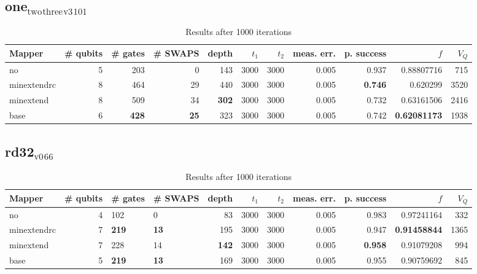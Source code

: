 \documentclass[11pt]{article}
\begin{document}
\subsection{one\(_{\text{two}}\)\(_{\text{three}}\)\(_{\text{v3}}\)\(_{\text{101}}\)}
\label{sec:orgfd1d4fc}
\begin{table}[H]
\caption{\label{tab:org465b645}
Results after 1000 iterations}
\centering
\small
\begin{tabular}{lrrrrrrrrrr}
\hline
Mapper & \# qubits & \# gates & \# SWAPS & depth & \(t_1\) & \(t_2\) & meas. err. & p. success & \(f\) & \(V_Q\)\\
\hline
no & 5 & 203 & 0 & 143 & 3000 & 3000 & 0.005 & 0.937 & 0.88807716 & 715\\
\hline
minextendrc & 8 & 464 & 29 & 440 & 3000 & 3000 & 0.005 & \textbf{0.746} & 0.620299 & 3520\\
minextend & 8 & 509 & 34 & \textbf{302} & 3000 & 3000 & 0.005 & 0.732 & 0.63161506 & 2416\\
base & 6 & \textbf{428} & \textbf{25} & 323 & 3000 & 3000 & 0.005 & 0.742 & \textbf{0.62081173} & 1938\\
\hline
\end{tabular}
\end{table}
\subsection{rd32\(_{\text{v0}}\)\(_{\text{66}}\)}
\label{sec:org7e40e8b}
\begin{table}[H]
\caption{\label{tab:orgaa34ee9}
Results after 1000 iterations}
\centering
\small
\begin{tabular}{lrllrrrrrrr}
\hline
Mapper & \# qubits & \# gates & \# SWAPS & depth & \(t_1\) & \(t_2\) & meas. err. & p. success & \(f\) & \(V_Q\)\\
\hline
no & 4 & 102 & 0 & 83 & 3000 & 3000 & 0.005 & 0.983 & 0.97241164 & 332\\
\hline
minextendrc & 7 & \textbf{219} & \textbf{13} & 195 & 3000 & 3000 & 0.005 & 0.947 & \textbf{0.91458844} & 1365\\
minextend & 7 & 228 & 14 & \textbf{142} & 3000 & 3000 & 0.005 & \textbf{0.958} & 0.91079208 & 994\\
base & 5 & \textbf{219} & \textbf{13} & 169 & 3000 & 3000 & 0.005 & 0.955 & 0.90759692 & 845\\
\hline
\end{tabular}
\end{table}
\end{document}
